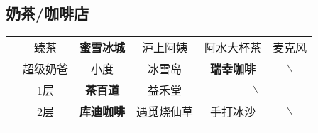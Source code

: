 \subsection[奶茶/咖啡店]{奶茶/咖啡店}
\begin{table}[H]
    \centering
    \begin{tabular}{|c|c|c|c|c|c|}
        \Xhline{1.2pt}
        \multirow{2}{*}{食堂} & 臻茶                                & \textbf{蜜雪冰城} & 沪上阿姨  %
                            & 阿水大杯茶                             & 麦克风                   \\
        \cline{2-6}
                            & 超级奶爸                              & 小度            & 冰雪岛   %
                            & \textbf{瑞幸咖啡}                     & $\backslash$          \\
        \Xhline{1.2pt}
        \multirow{2}{*}{大服} & 1层                                & \textbf{茶百道}  & 益禾堂   %
                            & \multicolumn{2}{c|}{$\backslash$}                         \\
        \cline{2-6}
                            & 2层                                & \textbf{库迪咖啡} & 遇觅烧仙草 %
                            & 手打冰沙                              & $\backslash$          \\
        \Xhline{1.2pt}
    \end{tabular}
\end{table}

